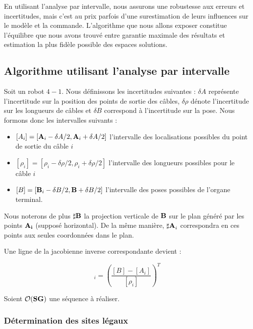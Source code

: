 En utilisant l'analyse par intervalle, nous assurons une robustesse aux erreurs 
et incertitudes, mais c'est au prix parfois d'une surestimation de leurs 
influences sur le mod\`ele et la commande. L'algorithme que nous allons 
exposer constitue l'\'equilibre que nous avons trouv\'e entre garantie maximale 
des r\'esultats et estimation la plus fid\`ele possible des espaces solutions.

\subsection{Algorithme utilisant l'analyse par intervalle}

Soit un robot $4-1$. Nous d\'efinissons les incertitudes suivantes : $\delta A$ 
repr\'esente l'incertitude sur la position des points de sortie des c\^ables, 
$\delta \rho$ d\'enote l'incertitude sur les longueurs de c\^ables et $\delta 
B$ correspond \`a l'incertitude sur la pose. Nous formons donc les intervalles 
suivants :
\begin{itemize}
 \item $[A_i] = [{\bf A}_i - \delta A/2,{\bf A}_i + \delta A/2]$ l'intervalle 
des localisations possibles du point de sortie du c\^able $i$
  \item $[\rho_i] = [\rho_i - \delta \rho /2,\rho_i + \delta \rho/2]$ 
l'intervalle des longueurs possibles pour le c\^able $i$
  \item $[B] = [{\bf B}_i - \delta B /2,{\bf B} + \delta B/2]$ l'intervalle 
des poses possibles de l'organe terminal.
\end{itemize}

Nous noterons de plus ${\bf \sharp B}$ la projection verticale de $\bf B$ sur 
le plan g\'en\'er\'e par les points ${\bf A_i}$ (suppos\'e horizontal). De la 
m\^eme mani\`ere, ${\bf \sharp A}_i$ correspondra en ces points aux seules 
coordonn\'ees dans le plan.

Une ligne de la jacobienne inverse correspondante devient :

\begin{equation}
[J^{-1}]_i = \left ( \frac {[B] - [A_i]}{[\rho_i]} \right )^T
\label{chap01:eq14}
\end{equation}

Soient $\mathcal O({\bf S}{\bf G})$ une s\'equence \`a r\'ealiser.

\subsubsection{D\'etermination des sites l\'egaux}


